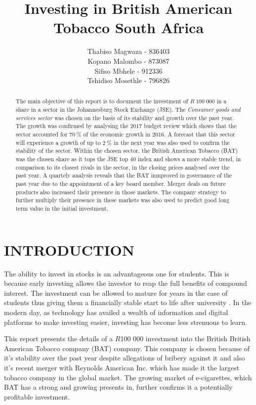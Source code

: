 \documentclass[letterpaper, 10 pt, conference]{ieeeconf}  %
\title{\LARGE \bf
Investing in British American Tobacco South Africa 
}
\author{Thabiso Magwaza - 836403 \\ Kopano Malombo - 873087\\ Sifiso Mbhele - 912336 \\ Tshidiso Mosethle - 796826 }
\begin{document}
\maketitle
\thispagestyle{empty}
\pagestyle{empty}


\begin{abstract}
The main objective of this report is to document the investment of $R~100~000$ in a share in a sector in the Johannesburg Stock Exchange (JSE). The \textit{Consumer goods and services sector} was chosen on the basis of its stability and growth over the past year. The growth was confirmed by analysing the $2017$ budget review which shows that the sector accounted for $70~\%$ of the economic growth in $2016$. A forecast that this sector will experience a growth of up to $2~\%$ in the next year was also used to confirm the stability of the sector. Within the chosen sector, the British American Tobacco (BAT) was the chosen share as it tops the JSE top 40 index and shows a more stable trend, in comparison to its closest rivals in the sector, in the closing prices analysed over the past year. A quartely analysis reveals that the BAT inmproved in governance of the past year due to the appointment of a key board member. Merger deals on future products also increased their presence in those markets. The company strategy to further multiply their presence in these markets was also used to predict good long term value in the initial investment.
\end{abstract}


\section{INTRODUCTION}

The ability to invest in stocks is an advantageous one for students. This is because early investing allows the investor to reap the full benefits of compound interest. The investment can be allowed to mature for years in the case of students thus giving them a financially stable start to life after university \cite{earlyInvestment}. In the modern day, as technology has availed a wealth of information and digital platforms to make investing easier, investing has become less strenuous to learn. 

This report presents the details of a $R$100 000 investment into the British British American Tobacco company (BAT) company. This company is chosen because of it's stability over the past year despite allegations of bribery against it and also it's recent merger with Reynolds American Inc. which has made it the largest tobacco company in the global market. The growing market of e-cigarettes, which BAT has a strong and growing presents in, further confirms it a potentially profitable investment.
\end{document}
